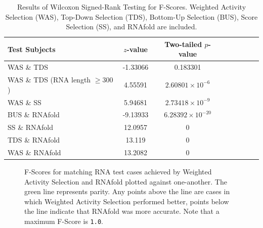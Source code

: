 \documentclass{cshonours}
\begin{document}
\begin{table}
\centering
\begin{tabular}{l*{6}{c}r}
Test Subjects	& $z$-value & Two-tailed $p$-value \\
\hline
WAS \& TDS 	& -1.33066 &	0.183301 \\
WAS \& TDS (RNA length $\geq 300$)	& 4.55591 &	$2.60801 \times 10 ^{-6}$ \\
WAS \& SS & 5.94681 &	$2.73418 \times 10^{-9}$  \\
\hline
BUS \& RNAfold & -9.13933 &	$6.28392 \times 10^{-20}$  \\
SS \& RNAfold & 12.0957 &	0  \\
TDS \& RNAfold & 13.119 &	0  \\
WAS \& RNAfold & 13.2082 &	0  \\
\end{tabular}

\caption{Results of Wilcoxon Signed-Rank Testing for F-Scores. Weighted Activity Selection (WAS), Top-Down Selection (TDS), Bottom-Up Selection (BUS), Score Selection (SS), and RNAfold are included.}
\label{tab:wilcoxonselection}
\end{table}


\begin{figure}
\begin{center}
\end{center}
\caption{F-Scores for matching RNA test cases achieved by Weighted Activity Selection and RNAfold plotted against one-another. The green line represents parity. Any points above the line are cases in which Weighted Activity Selection performed better, points below the line indicate that RNAfold was more accurate. Note that a maximum F-Score is \texttt{1.0}.}
\label{fig:wasrnafold}
\end{figure}
\end{document}
